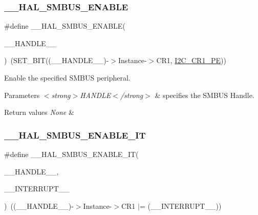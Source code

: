 \subsubsection{\texorpdfstring{\+\_\+\+\_\+\+H\+A\+L\+\_\+\+S\+M\+B\+U\+S\+\_\+\+E\+N\+A\+B\+LE}{\_\_HAL\_SMBUS\_ENABLE}}
{\footnotesize\ttfamily \#define \+\_\+\+\_\+\+H\+A\+L\+\_\+\+S\+M\+B\+U\+S\+\_\+\+E\+N\+A\+B\+LE(\begin{DoxyParamCaption}\item[{}]{\+\_\+\+\_\+\+H\+A\+N\+D\+L\+E\+\_\+\+\_\+ }\end{DoxyParamCaption})~(S\+E\+T\+\_\+\+B\+IT((\+\_\+\+\_\+\+H\+A\+N\+D\+L\+E\+\_\+\+\_\+)-\/$>$Instance-\/$>$C\+R1, \hyperlink{group___peripheral___registers___bits___definition_ga953b0d38414808db79da116842ed3262}{I2\+C\+\_\+\+C\+R1\+\_\+\+PE}))}



Enable the specified S\+M\+B\+US peripheral. 


\begin{DoxyParams}{Parameters}
{\em $<$strong$>$\+H\+A\+N\+D\+L\+E$<$/strong$>$} & specifies the S\+M\+B\+US Handle. \\
\hline
\end{DoxyParams}

\begin{DoxyRetVals}{Return values}
{\em None} & \\
\hline
\end{DoxyRetVals}
\mbox{\label{group___s_m_b_u_s___exported___macros_ga5c97c2d61aea9155e23c86106e6d29fc}} 
\subsubsection{\texorpdfstring{\+\_\+\+\_\+\+H\+A\+L\+\_\+\+S\+M\+B\+U\+S\+\_\+\+E\+N\+A\+B\+L\+E\+\_\+\+IT}{\_\_HAL\_SMBUS\_ENABLE\_IT}}
{\footnotesize\ttfamily \#define \+\_\+\+\_\+\+H\+A\+L\+\_\+\+S\+M\+B\+U\+S\+\_\+\+E\+N\+A\+B\+L\+E\+\_\+\+IT(\begin{DoxyParamCaption}\item[{}]{\+\_\+\+\_\+\+H\+A\+N\+D\+L\+E\+\_\+\+\_\+,  }\item[{}]{\+\_\+\+\_\+\+I\+N\+T\+E\+R\+R\+U\+P\+T\+\_\+\+\_\+ }\end{DoxyParamCaption})~((\+\_\+\+\_\+\+H\+A\+N\+D\+L\+E\+\_\+\+\_\+)-\/$>$Instance-\/$>$C\+R1 $\vert$= (\+\_\+\+\_\+\+I\+N\+T\+E\+R\+R\+U\+P\+T\+\_\+\+\_\+))}



